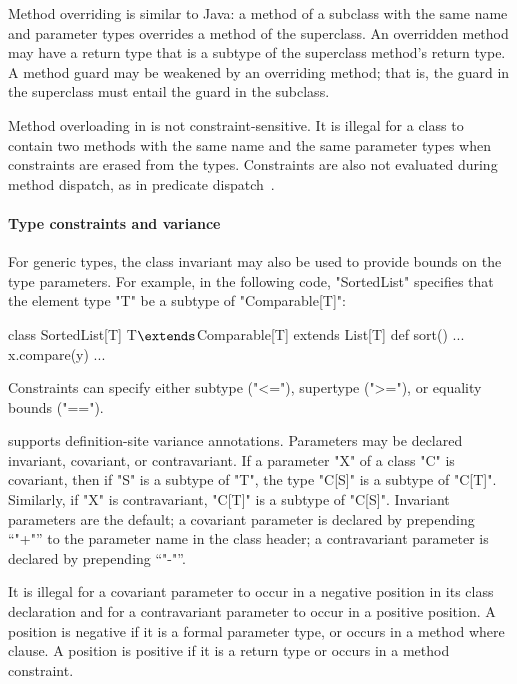 Method overriding is similar to Java: a method of a subclass
with the same name and parameter types overrides a method of the
superclass.  An overridden method may have a return type that is
a subtype of the superclass method's return type.
A method guard may be weakened by an overriding
method; that is, the guard in the superclass must entail the  
guard in the subclass.

Method overloading in \Xten is not constraint-sensitive.  It is
illegal for a class to contain two methods with the same name
and the same parameter types when constraints are erased from the 
types.  Constraints are also not evaluated during method
dispatch, as in predicate dispatch~\cite{jpred}.


\paragraph{Type constraints and variance}
\label{sec:variance-overview}

For generic types, the class invariant may also be used to provide 
bounds on the type parameters.
For example, in the following code,
\xcd"SortedList" 
specifies that the element type \xcd"T"
be a subtype of \xcd"Comparable[T]":
\begin{xtenmathnoindent}
 class SortedList[T] {T$\extends$Comparable[T]} extends List[T] {
   def sort() { ... x.compare(y) ... }
 }
\end{xtenmathnoindent}
Constraints can specify either subtype (\xcd"<="), supertype (\xcd">="),
or equality bounds (\xcd"==").

\Xten supports definition-site variance annotations.
Parameters may be declared invariant, covariant, or
contravariant.
If a parameter \xcd"X" of a class \xcd"C" is covariant,
then if \xcd"S" is a subtype of
\xcd"T", the type \xcd"C[S]" is a subtype of \xcd"C[T]".
Similarly, if \xcd"X" is contravariant, 
\xcd"C[T]" is a subtype of \xcd"C[S]".
Invariant parameters are the default; a covariant parameter is
declared by prepending ``\xcd"+"'' to the parameter name in the
class header; a contravariant parameter is declared by
prepending ``\xcd"-"''.

It is illegal for a covariant parameter to occur in a negative
position in its class declaration and for a contravariant
parameter to occur in a positive position.  A position is
negative if it is a formal parameter type, or occurs in a method
where clause.  A position is positive if it is a return type or
occurs in a method constraint.




